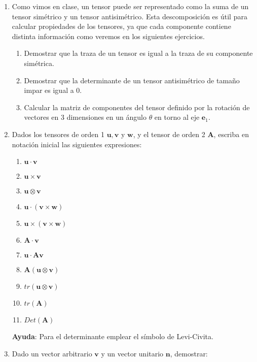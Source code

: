 \documentclass[12pt,a4paper]{article}
\title{\mathbf{Mecánica de Medios Continuos \\Practica 0 \\ Álgebra y cálculo vectorial y tensorial}}
\author{Universidad de Cuenca}
\begin{document}
\maketitle
\begin{enumerate}
    \item Como vimos en clase, un tensor puede ser representado como la suma de un tensor simétrico y un tensor antisimétrico. 
    Esta descomposición es útil para calcular propiedades de los tensores, ya que cada componente contiene distinta información como veremos en los siguientes ejercicios.
    \begin{enumerate}
        \item Demostrar que la traza de un tensor es igual a la traza de su componente simétrica.
        \item Demostrar que la determinante de un tensor antisimétrico de tamaño impar es igual a 0.
        \item Calcular la matriz de componentes del tensor definido por la rotación de vectores en 3 dimensiones en un ángulo $\theta$ en torno al eje $\mathbf{e}_1$.
    \end{enumerate}
    \item Dados los tensores de orden 1 $\mathbf{u}, \mathbf{v}$ y $\mathbf{w}$, y el tensor de orden 2 $\mathbf{A}$, 
    escriba en notación inicial las siguientes expresiones:
    \begin{enumerate}
        \item $\mathbf{u} \cdot \mathbf{v}$
        \item $\mathbf{u} \times \mathbf{v}$
        \item $\mathbf{u} \otimes \mathbf{v}$
        \item $\mathbf{u} \cdot (\mathbf{v}\times \mathbf{w})$
        \item $\mathbf{u} \times( \mathbf{v}\times \mathbf{w})$
        \item $\mathbf{A} \cdot \mathbf{v}$
        \item $\mathbf{u} \cdot \mathbf{A} \mathbf{v}$
        \item $\mathbf{A}  (\mathbf{u}\otimes\mathbf{v})$
        \item $tr(\mathbf{u} \otimes \mathbf{v})$
        \item $tr(\mathbf{A})$
        \item $Det(\mathbf{A})$
    \end{enumerate}
    \textbf{Ayuda}: Para el determinante emplear el símbolo de Levi-Civita.  
    \item Dado un vector arbitrario $\mathbf{v}$ y un vector unitario $\mathbf{n}$, demostrar:

\end{enumerate}
\end{document}
